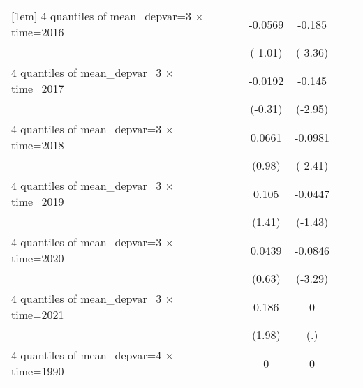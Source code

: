 \begin{table}[htbp]
\begin{tabular}{l*{6}{c}}
[1em]
4 quantiles of mean\_depvar=3 $\times$ time=2016&                     &                     &     -0.0569         &      -0.185\sym{***}&                     &                     \\
                    &                     &                     &     (-1.01)         &     (-3.36)         &                     &                     \\
[1em]
4 quantiles of mean\_depvar=3 $\times$ time=2017&                     &                     &     -0.0192         &      -0.145\sym{***}&                     &                     \\
                    &                     &                     &     (-0.31)         &     (-2.95)         &                     &                     \\
[1em]
4 quantiles of mean\_depvar=3 $\times$ time=2018&                     &                     &      0.0661         &     -0.0981\sym{**} &                     &                     \\
                    &                     &                     &      (0.98)         &     (-2.41)         &                     &                     \\
[1em]
4 quantiles of mean\_depvar=3 $\times$ time=2019&                     &                     &       0.105         &     -0.0447         &                     &                     \\
                    &                     &                     &      (1.41)         &     (-1.43)         &                     &                     \\
[1em]
4 quantiles of mean\_depvar=3 $\times$ time=2020&                     &                     &      0.0439         &     -0.0846\sym{***}&                     &                     \\
                    &                     &                     &      (0.63)         &     (-3.29)         &                     &                     \\
[1em]
4 quantiles of mean\_depvar=3 $\times$ time=2021&                     &                     &       0.186\sym{*}  &           0         &                     &                     \\
                    &                     &                     &      (1.98)         &         (.)         &                     &                     \\
[1em]
4 quantiles of mean\_depvar=4 $\times$ time=1990&                     &                     &           0         &           0         &                     &                     \\

\end{tabular}
\end{table}
